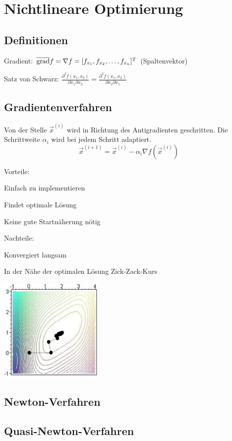 \section{Nichtlineare Optimierung}
\subsection{Definitionen}
  Gradient: $\overline{\operatorname{grad}} f = \nabla f = [f_{x_1}, f_{x_2}, \ldots, f_{x_n} ]^T$ (Spaltenvektor)
  
  Satz von Schwarz: $\frac{\partial^2 f(x_1, x_2)}{\partial x_1 \partial x_2} = \frac{\partial^2 f(x_1, x_2)}{\partial x_2 \partial x_1}$

\subsection{Gradientenverfahren}
  \begin{minipage}{14cm}
    Von der Stelle $\vec{x}^{(i)}$ wird in Richtung des Antigradienten geschritten. Die Schrittweite
    $\alpha_i$ wird bei jedem Schritt adaptiert. 
    $$\vec{x}^{(i+1)} = \vec{x}^{(i)} - \alpha_i \nabla f(\vec{x}^{(i)})$$
    
    Vorteile:
    \begin{liste}
      \item Einfach zu implementieren
      \item Findet optimale Lösung
      \item Keine gute Startnäherung nötig
    \end{liste}
    
    Nachteile:
    \begin{liste}
      \item Konvergiert langsam
      \item In der Nähe der optimalen Lösung Zick-Zack-Kurs
    \end{liste}
  \end{minipage}
  \begin{minipage}{5cm}
    \includegraphics[width=5cm]{./Content/NonLinearOptimization/gradient-descent}
  \end{minipage}
  
\subsection{Newton-Verfahren}
  
  
  
\subsection{Quasi-Newton-Verfahren}
